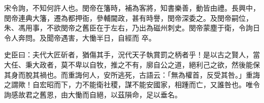 \begin{pinyinscope}
 宋令詢，不知何許人也。閔帝在籓時，補為客將，知書樂善，動皆由禮。長興中，閔帝連典大籓，遷為都押衙，參輔閫政，甚有時譽，閔帝深委之。及閔帝嗣位，朱、馮用事，不欲閔帝之舊臣在于左右，乃出為磁州刺史。閔帝蒙塵于衛，令詢日令人奔問。及聞帝遇害，大慟半日，自經而
 卒。



 史臣曰：夫代大匠斫者，猶傷其手，況代天子執賞罰之柄者乎！是以古之賢人，當大任、秉大政者，莫不卑以自牧，推之不有，廓自公之道，絕利己之欲，然後能保其身而脫其禍也。而重誨何人，安所逃死，古語云：「無為權首，反受其咎。」重誨之謂歟！自宏昭而下，力不能衛社稷，謀不能安國家，相踵而亡，又誰咎也。唯令詢感故君之舊恩，由大慟而自絕，以茲隕命，足以垂名。



\end{pinyinscope}